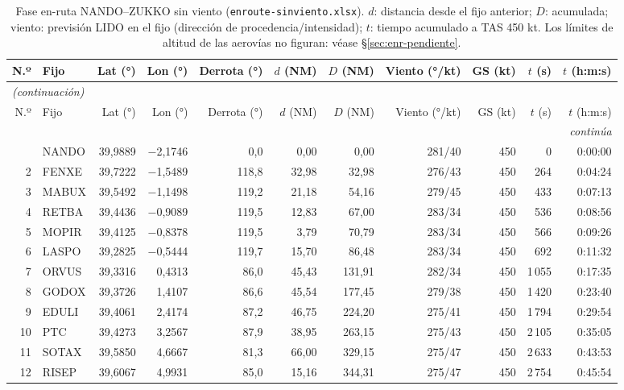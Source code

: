 \begingroup\scriptsize\setlength{\tabcolsep}{2.8pt}
\begin{longtable}{rlrrrrrrrrr}
\caption{Fase en-ruta NANDO--ZUKKO sin viento (\texttt{enroute-sinviento.xlsx}). $d$: distancia desde el fijo anterior; $D$: acumulada; viento: previsión LIDO en el fijo (dirección de procedencia/intensidad); $t$: tiempo acumulado a TAS 450 kt. Los límites de altitud de las aerovías no figuran: véase \S\ref{sec:enr-pendiente}.}\label{tab:enr0}\\
\toprule
N.º & Fijo & Lat (°) & Lon (°) & Derrota (°) & $d$ (NM) & $D$ (NM) & Viento (°/kt) & GS (kt) & $t$ (s) & $t$ (h:m:s)\\
\midrule
\endfirsthead
\multicolumn{11}{l}{\small\itshape (continuación)}\\
\toprule
N.º & Fijo & Lat (°) & Lon (°) & Derrota (°) & $d$ (NM) & $D$ (NM) & Viento (°/kt) & GS (kt) & $t$ (s) & $t$ (h:m:s)\\
\midrule
\endhead
\midrule
\multicolumn{11}{r}{\small\itshape continúa}\\
\endfoot
\bottomrule
\endlastfoot
1 & NANDO & 39,9889 & $-$2,1746 & 0,0 & 0,00 & 0,00 & 281/40 & 450 & 0 & 0:00:00\\
2 & FENXE & 39,7222 & $-$1,5489 & 118,8 & 32,98 & 32,98 & 276/43 & 450 & 264 & 0:04:24\\
3 & MABUX & 39,5492 & $-$1,1498 & 119,2 & 21,18 & 54,16 & 279/45 & 450 & 433 & 0:07:13\\
4 & RETBA & 39,4436 & $-$0,9089 & 119,5 & 12,83 & 67,00 & 283/34 & 450 & 536 & 0:08:56\\
5 & MOPIR & 39,4125 & $-$0,8378 & 119,5 & 3,79 & 70,79 & 283/34 & 450 & 566 & 0:09:26\\
6 & LASPO & 39,2825 & $-$0,5444 & 119,7 & 15,70 & 86,48 & 283/34 & 450 & 692 & 0:11:32\\
7 & ORVUS & 39,3316 & 0,4313 & 86,0 & 45,43 & 131,91 & 282/34 & 450 & 1\,055 & 0:17:35\\
8 & GODOX & 39,3726 & 1,4107 & 86,6 & 45,54 & 177,45 & 279/38 & 450 & 1\,420 & 0:23:40\\
9 & EDULI & 39,4061 & 2,4174 & 87,2 & 46,75 & 224,20 & 275/41 & 450 & 1\,794 & 0:29:54\\
10 & PTC & 39,4273 & 3,2567 & 87,9 & 38,95 & 263,15 & 275/43 & 450 & 2\,105 & 0:35:05\\
11 & SOTAX & 39,5850 & 4,6667 & 81,3 & 66,00 & 329,15 & 275/47 & 450 & 2\,633 & 0:43:53\\
12 & RISEP & 39,6067 & 4,9931 & 85,0 & 15,16 & 344,31 & 275/47 & 450 & 2\,754 & 0:45:54\\

\end{longtable}

